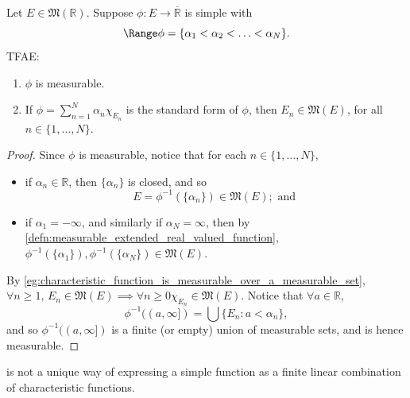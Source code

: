\documentclass[notoc,notitlepage]{tufte-book}
\begin{document}
\begin{propo}\label{propo:measurability_of_simple_functions_with_measurable_support}
  Let $E \in \mathfrak{M}(\mathbb{R})$. Suppose $\phi : E \to
  \overline{\mathbb{R}}$ is simple with
  \begin{equation*}
    \Range \phi = \{ \alpha_1 < \alpha_2 < \hdots < \alpha_N \}.
  \end{equation*}
  TFAE:
  \begin{enumerate}
    \item $\phi$ is measurable.
    \item If $\phi = \sum_{n=1}^{N} \alpha_n \chi_{E_n}$ is the standard form of
      $\phi$, then $E_n \in \mathfrak{M}(E)$, for all $n \in \{1, \ldots, N \}$.
  \end{enumerate}
\end{propo}

\begin{proof}
  \hlbnoted{$(\implies)$} Since $\phi$ is measurable, notice that for each $n
  \in \{1, \ldots, N\}$,
  \begin{itemize}
    \item if $\alpha_n \in \mathbb{R}$, then $\{ \alpha_n \}$ is closed, and so
      \begin{equation*}
        E = \phi^{-1}(\{\alpha_n\}) \in \mathfrak{M}(E); \text{ and }
      \end{equation*}
    \item if $\alpha_1 = -\infty$, and similarly if $\alpha_N = \infty$, then by
      \cref{defn:measurable_extended_real_valued_function},
      $\phi^{-1}(\{\alpha_1\}), \phi^{-1}(\{\alpha_N\}) \in \mathfrak{M}(E)$.
  \end{itemize}

  \noindent
  \hlbnoted{$(\impliedby)$} By
  \cref{eg:characteristic_function_is_measurable_over_a_measurable_set},
  $\forall n \geq 1,\, E_n \in \mathfrak{M}(E) \implies \forall n \geq 0
  \chi_{E_n} \in \mathfrak{M}(E)$. Notice that $\forall a \in \mathbb{R}$,
  \begin{equation*}
    \phi^{-1}((a, \infty]) = \bigcup \{ E_n : a < \alpha_n \},
  \end{equation*}
  and so $\phi^{-1}((a, \infty])$ is a finite (or empty) union of measurable
  sets, and is hence measurable.
\end{proof}

 is not a unique way of expressing a simple
function as a finite linear combination of characteristic functions.
\end{document}
